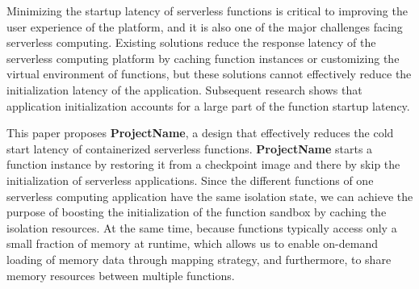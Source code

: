 Minimizing the startup latency of serverless functions is critical to improving the user experience of the platform\cite{serverless-user-experience-1,serverless-user-experience-2},
and it is also one of the major challenges facing serverless computing\cite{berkeley-view,serverless-trends}.
Existing solutions reduce the response latency of the serverless computing platform by caching function instances\cite{pool1,pool2} or customizing the virtual environment of functions\cite{firecracker,faasm},
but these solutions cannot effectively reduce the initialization latency of the application.
Subsequent research shows that application initialization accounts for a large part of the function startup latency.


This paper proposes \textbf{ProjectName}, 
a design that effectively reduces the cold start latency of containerized serverless functions. 
\textbf{ProjectName} starts a function instance by restoring it from a checkpoint image and there by skip the initialization of serverless applications. 
Since the different functions of one serverless computing application have the same isolation state, 
we can achieve the purpose of boosting the initialization of the function sandbox by caching the isolation resources. 
At the same time, because functions typically access only a small fraction of memory at runtime, 
which allows us to enable on-demand loading of memory data through mapping strategy, 
and furthermore, to share memory resources between multiple functions.


